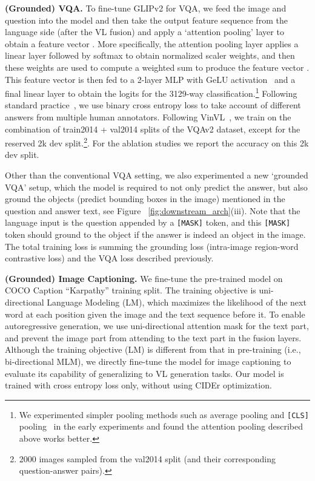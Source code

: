 \documentclass{article}
\begin{document}
\textbf{(Grounded) VQA.} To fine-tune GLIPv2 for VQA, we feed the image and question into the model and then take the output feature sequence  from the language side (after the VL fusion) and apply a `attention pooling' layer to obtain a feature vector . More specifically, the attention pooling layer applies a linear layer followed by softmax to obtain normalized scaler weights, and then these weights are used to compute a weighted sum to produce the feature vector . This feature vector is then fed to a 2-layer MLP with GeLU activation~\cite{hendrycks2016gaussian} and a final linear layer to obtain the logits for the 3129-way classification.\footnote{We experimented simpler pooling methods such as average pooling and \texttt{[CLS]} pooling~\cite{devlin2018bert} in the early experiments and found the attention pooling described above works better.} Following standard practice~\cite{teney2018tips}, we use binary cross entropy loss to take account of different answers from multiple human annotators.
Following VinVL~\cite{Zhang_2021_CVPR}, we train on the combination of train2014 + val2014 splits of the VQAv2 dataset, except for the reserved 2k dev split.\footnote{2000 images sampled from the val2014 split (and their corresponding question-answer pairs).}. For the ablation studies we report the accuracy on this 2k dev split. 

Other than the conventional VQA setting, we also experimented a new `grounded VQA' setup, which the model is required to not only predict the answer, but also ground the objects (predict bounding boxes in the image) mentioned in the question and answer text, see Figure ~\ref{fig:downstream_arch}(iii). Note that the language input is the question appended by a \texttt{[MASK]} token, and this \texttt{[MASK]} token should ground to the object if the answer is indeed an object in the image. The total training loss is summing the grounding loss (intra-image region-word contrastive loss) and the VQA loss described previously.

\textbf{(Grounded) Image Captioning.} We fine-tune the pre-trained model on COCO Caption ``Karpathy'' training split. The training objective is uni-directional Language Modeling (LM), which maximizes the likelihood of the next word at each position given the image and the text sequence before it. To enable autoregressive generation, we use uni-directional attention mask for the text part, and prevent the image part from attending to the text part in the fusion layers. Although the training objective (LM) is different from that in pre-training (i.e., bi-directional MLM), we directly fine-tune the model for image captioning to evaluate its capability of generalizing to VL generation tasks. Our model is trained with cross entropy loss only, without using CIDEr optimization. 
\end{document}
